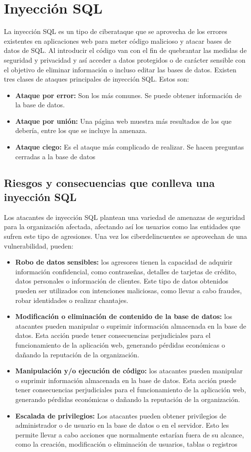 \documentclass[11pt]{report}
\begin{document}
\section{Inyección SQL}
La inyección SQL es un tipo de ciberataque que se aprovecha de los errores existentes en
aplicaciones web para meter código malicioso y atacar bases de datos de SQL. Al introducir
el código van con el fin de quebrantar las medidas de seguridad y privacidad y así acceder a
datos protegidos o de carácter sensible con el objetivo de eliminar información o incluso
editar las bases de datos.
Existen tres clases de ataques principales de inyección SQL. Estos son:
\begin{itemize}
\item \textbf{Ataque por error:} Son los más comunes. Se puede obtener información de la base
de datos.
\item \textbf{Ataque por unión:} Una página web muestra más resultados de los que debería,
entre los que se incluye la amenaza.
\item \textbf{Ataque ciego:} Es el ataque más complicado de realizar. Se hacen preguntas
cerradas a la base de datos
\end{itemize}

\subsection{Riesgos y consecuencias que conlleva una inyección SQL}
Los atacantes de inyección SQL plantean una variedad de amenazas de seguridad para la
organización afectada, afectando así los usuarios como las entidades que sufren este tipo
de agresiones. Una vez los ciberdelincuentes se aprovechan de una vulnerabilidad, pueden:
\begin{itemize}
\item \textbf{Robo de datos sensibles:} los agresores tienen la capacidad de adquirir información
confidencial, como contraseñas, detalles de tarjetas de crédito, datos personales o
información de clientes. Este tipo de datos obtenidos pueden ser utilizados con
intenciones maliciosas, como llevar a cabo fraudes, robar identidades o realizar
chantajes.
\item \textbf{Modificación o eliminación de contenido de la base de datos:} los atacantes pueden
manipular o suprimir información almacenada en la base de datos. Esta acción
puede tener consecuencias perjudiciales para el funcionamiento de la aplicación
web, generando pérdidas económicas o dañando la reputación de la organización.
\item \textbf{Manipulación y/o ejecución de código:} los atacantes pueden manipular o suprimir
información almacenada en la base de datos. Esta acción puede tener
consecuencias perjudiciales para el funcionamiento de la aplicación web, generando
pérdidas económicas o dañando la reputación de la organización.
\item \textbf{Escalada de privilegios:} Los atacantes pueden obtener privilegios de administrador o
de usuario en la base de datos o en el servidor. Esto les permite llevar a cabo
acciones que normalmente estarían fuera de su alcance, como la creación,
modificación o eliminación de usuarios, tablas o registros
\end{itemize}
\end{document}
